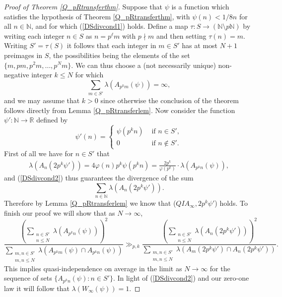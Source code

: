 \documentclass[12pt,reqno]{amsart}
\begin{document}
\begin{proof}[Proof of Theorem \ref{Q_pRtransferthm}]
Suppose that $\psi$ is a function which satisfies the hypothesis of Theorem \ref{Q_pRtransferthm}, with $\psi (n)<1/8n$ for all $n\in{\mathbb{N}}$, and for which (\ref{DSdivcond1}) holds. Define a map $\tau:S{\rightarrow}({\mathbb{N}}\setminus p{\mathbb{N}})$ by writing each integer $n\in S$ as $n=p^\ell m$ with $p\nmid m$ and then setting $\tau (n)=m$. Writing $S'=\tau (S)$ it follows that each integer in $m\in S'$ has at most $N+1$ preimages in $S$, the possibilities being the elements of the set $\{m,pm,p^2m,\ldots ,p^Nm\}$. We can thus choose a (not necessarily unique) non-negative integer $k\le N$ for which
\begin{equation}\label{DSdivcond2}
\sum_{m\in S'}\lambda (A_{p^km}(\psi))=\infty,
\end{equation}
and we may assume that $k>0$ since otherwise the conclusion of the theorem follows directly from Lemma \ref{Q_pRtransferlem}. Now consider the function $\psi':{\mathbb{N}}{\rightarrow}{\mathbb{R}}$ defined by \[\psi'(n)=\begin{cases} \psi (p^kn)&\text{ if } n\in S',\\0 &\text{ if } n\notin S'.\end{cases}\]
First of all we have for $n\in S'$ that
\begin{align}\label{DSdivcond3}
\lambda (A_n(2p^k\psi'))=4\varphi (n)p^k\psi (p^kn)=\frac{2p^k}{\varphi (p^k)}\cdot\lambda (A_{p^kn}(\psi)),
\end{align}
and (\ref{DSdivcond2}) thus guarantees the divergence of the sum
\[\sum_{n\in{\mathbb{N}}}\lambda (A_n(2p^k\psi')).\]
Therefore by Lemma \ref{Q_pRtransferlem} we know that ($QIA_\infty , 2p^k\psi'$) holds. To finish our proof we will show that as $N{\rightarrow}\infty$,
\begin{equation}\label{DSlimsupeqn1}
\frac{\left(\sum_{\substack{n\in S'\\n\le N}}
    \lambda(A_{p^kn}(\psi))\right)^2}{\sum_{\substack{m,n\in S'\\m,n\le N}}
    \lambda(A_{p^km}(\psi)\cap A_{p^kn}(\psi))}\gg_{p,k} \frac{\left(\sum_{\substack{n\in S'\\n\le N}}
    \lambda(A_n(2p^k\psi'))\right)^2}{\sum_{\substack{m,n\in S'\\m,n\le N}}
    \lambda(A_m(2p^k\psi')\cap A_n(2p^k\psi'))}.
\end{equation}
This implies quasi-independence on average in the limit as $N{\rightarrow}\infty$ for the sequence of sets $\{A_{p^kn}(\psi):n\in S'\}$. In light of (\ref{DSdivcond2}) and our zero-one law it will follow that $\lambda(W_\infty(\psi))=1$.


\end{proof}
\end{document}
